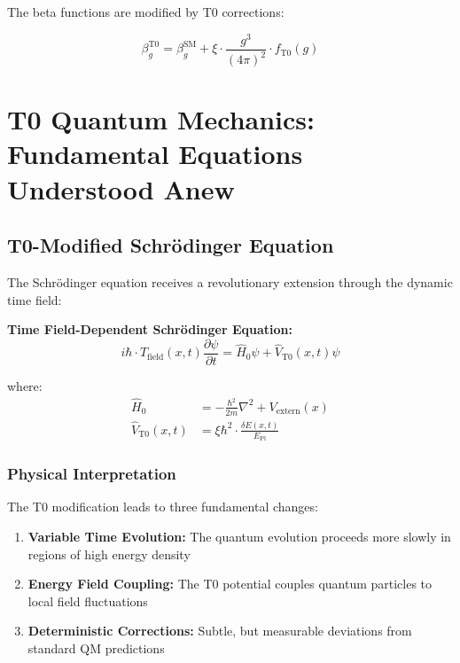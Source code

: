 \documentclass[12pt,a4paper]{article}
\newcommand{\xipar}{\xi}
\newcommand{\deltaE}{\delta E}
\begin{document}
	The beta functions are modified by T0 corrections:
	
	\begin{equation}
		\beta_g^{\text{T0}} = \beta_g^{\text{SM}} + \xipar \cdot \frac{g^3}{(4\pi)^2} \cdot f_{\text{T0}}(g)
	\end{equation}
	
	\section{T0 Quantum Mechanics: Fundamental Equations Understood Anew}
	
	\subsection{T0-Modified Schrödinger Equation}
	
	The Schrödinger equation receives a revolutionary extension through the dynamic time field:
	
	\begin{tcolorbox}[colback=cyan!5!white,colframe=cyan!75!black,title={T0 Schrödinger Equation}]
		\textbf{Time Field-Dependent Schrödinger Equation:}
		\begin{equation}
			i\hbar \cdot T_{\text{field}}(x,t) \frac{\partial\psi}{\partial t} = \hat{H}_0 \psi + \hat{V}_{\text{T0}}(x,t) \psi
		\end{equation}
		
		where:
		\begin{align}
			\hat{H}_0 &= -\frac{\hbar^2}{2m} \nabla^2 + V_{\text{extern}}(x) \\
			\hat{V}_{\text{T0}}(x,t) &= \xipar \hbar^2 \cdot \frac{\deltaE(x,t)}{E_{\text{Pl}}}
		\end{align}
	\end{tcolorbox}
	
	\subsubsection{Physical Interpretation}
	
	The T0 modification leads to three fundamental changes:
	
	\begin{enumerate}
		\item \textbf{Variable Time Evolution:} The quantum evolution proceeds more slowly in regions of high energy density
		\item \textbf{Energy Field Coupling:} The T0 potential couples quantum particles to local field fluctuations
		\item \textbf{Deterministic Corrections:} Subtle, but measurable deviations from standard QM predictions
	\end{enumerate}
	
\end{document}
